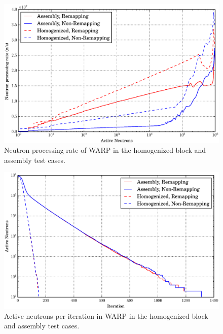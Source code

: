 \begin{figure}[h!]
\centering
\includegraphics[width=\textwidth]{graphics/finalresults/process_rate.eps}
\caption{Neutron processing rate of WARP in the homogenized block and assembly test cases. \label{process_rate} }
\end{figure}

\begin{figure}[h!]
\centering
\includegraphics[width=\textwidth]{graphics/finalresults/process_rate_iteration.eps}
\caption{Active neutrons per iteration in WARP in the homogenized block and assembly test cases. \label{active_iteration} }
\end{figure}

